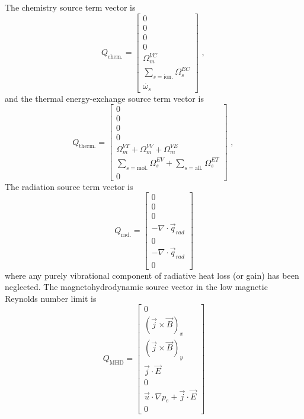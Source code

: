 \medskip
The chemistry source term vector is
\begin{equation}
 Q_{\text{chem.}} = \left [ \begin{array}{c} 0 \\ 0 \\ 0 \\ 0 \\ \Omega^{VC}_{m} \\ \sum_{s=\text{ion.}} \Omega^{EC}_{s} \\ \dot{\omega_{s}} \end{array} \right ] \text{ , }
 \label{eq:Q_chem}
\end{equation}
and the thermal energy-exchange source term vector is
\begin{equation}
 Q_{\text{therm.}} = \left [ \begin{array}{c} 0 \\ 0 \\ 0 \\ 0 \\ \Omega^{VT}_{m} + \Omega^{VV}_{m} + \Omega^{VE}_{m} \\ \sum_{s=\text{mol.}}\Omega^{EV}_{s} +  \sum_{s=\text{all.}}\Omega^{ET}_{s} \\ 0 \end{array} \right ] \text{ , }
 \label{eq:Q_therm}
\end{equation}
The radiation source term vector is
\begin{equation}
 Q_{\text{rad.}} = \left [ \begin{array}{c} 0 \\ 0 \\ 0 \\ -\nabla \cdot \vec{q}_{rad} \\ 0 \\ -\nabla \cdot \vec{q}_{rad} \\ 0 \end{array} \right ]
 \label{eq:Q_rad}
\end{equation}
where any purely vibrational component of radiative heat loss (or gain) has been neglected.
The magnetohydrodynamic source vector in the low magnetic Reynolds number limit is
\begin{equation}
 Q_{\text{MHD}} = \left [ \begin{array}{c} 0 \\ \left ( \vec{j} \times \vec{B} \right )_x \\ \left ( \vec{j} \times \vec{B} \right )_y \\ \vec{j} \cdot \vec{E} \\ 0 \\ \vec{u} \cdot \nabla p_e + \vec{j} \cdot \vec{E} \\ 0 \end{array} \right ]
 \label{eq:Q_MHD}
\end{equation}
